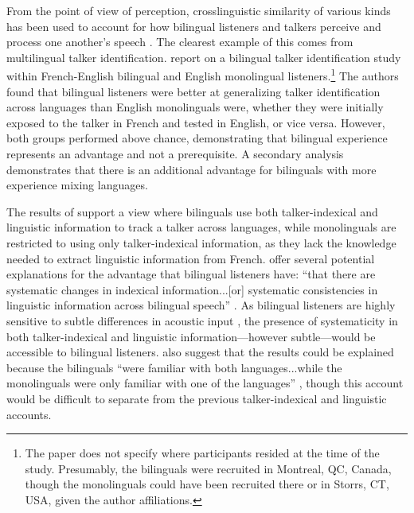 From the point of view of perception, crosslinguistic similarity of various kinds has been used to account for how bilingual listeners and talkers perceive and process one another's speech \citep{chang_2015_similarity}. The clearest example of this comes from multilingual talker identification. \citet{orena_2019_identifying} report on a bilingual talker identification study within French-English bilingual and English monolingual listeners.\footnote{The paper does not specify where participants resided at the time of the study. Presumably, the bilinguals were recruited in Montreal, QC, Canada, though the monolinguals could have been recruited there or in Storrs, CT, USA, given the author affiliations.} The authors found that bilingual listeners were better at generalizing talker identification across languages than English monolinguals were, whether they were initially exposed to the talker in French and tested in English, or vice versa. However, both groups performed above chance, demonstrating that bilingual experience represents an advantage and not a prerequisite. A secondary analysis demonstrates that there is an additional advantage for bilinguals with more experience mixing languages. 


The results of \citet{orena_2019_identifying} support a view where bilinguals use both talker-indexical and linguistic information to track a talker across languages, while monolinguals are restricted to using only talker-indexical information, as they lack the knowledge needed to extract linguistic information from French.  \citeauthor{orena_2019_identifying} offer several potential explanations for the advantage that bilingual listeners have: ``that there are systematic changes in indexical information...[or] systematic consistencies in linguistic information across bilingual speech'' \citeyearpar[][p. EL308]{orena_2019_identifying}. As bilingual listeners are highly sensitive to subtle differences in acoustic input \citep{ju_2004_falling}, the presence of systematicity in both talker-indexical and linguistic information---however subtle---would be accessible to bilingual listeners. \citeauthor{orena_2019_identifying} also suggest that the results could be explained because the bilinguals ``were familiar with both languages...while the monolinguals were only familiar with one of the languages'' \citeyearpar[][p. EL309]{orena_2019_identifying}, though this account would be difficult to separate from the previous talker-indexical and linguistic accounts. 

